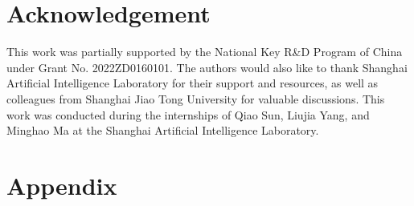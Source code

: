 \documentclass[11pt]{article}
\begin{document}
\section{Acknowledgement}
This work was partially supported by the National Key R\&D Program of China under Grant No. 2022ZD0160101. The authors would also like to thank Shanghai Artificial Intelligence Laboratory for their support and resources, as well as colleagues from Shanghai Jiao Tong University for valuable discussions. This work was conducted during the internships of Qiao Sun, Liujia Yang, and Minghao Ma at the Shanghai Artificial Intelligence Laboratory.







\appendix


\section{Appendix}
\label{sec:appendix}
\end{document}
